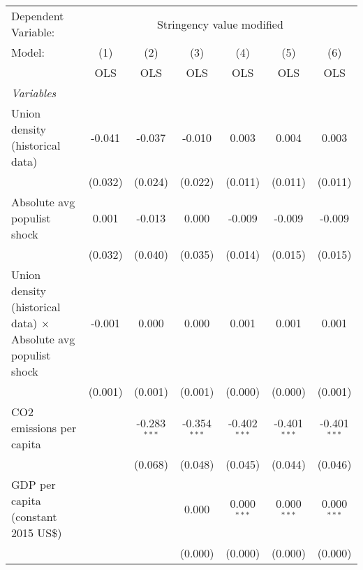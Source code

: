 
\begingroup
\centering
\begin{tabular}{lcccccc}
   \toprule
   Dependent Variable: & \multicolumn{6}{c}{Stringency value modified}\\
   Model:                                                                & (1)     & (2)            & (3)            & (4)            & (5)            & (6)\\  
                                                                         &  OLS    & OLS            & OLS            & OLS            & OLS            & OLS\\  
   \midrule
   \emph{Variables}\\
   Union density (historical data)                                       & -0.041  & -0.037         & -0.010         & 0.003          & 0.004          & 0.003\\   
                                                                         & (0.032) & (0.024)        & (0.022)        & (0.011)        & (0.011)        & (0.011)\\   
   Absolute avg populist shock                                           & 0.001   & -0.013         & 0.000          & -0.009         & -0.009         & -0.009\\   
                                                                         & (0.032) & (0.040)        & (0.035)        & (0.014)        & (0.015)        & (0.015)\\   
   Union density (historical data) $\times$ Absolute avg populist shock  & -0.001  & 0.000          & 0.000          & 0.001          & 0.001          & 0.001\\   
                                                                         & (0.001) & (0.001)        & (0.001)        & (0.000)        & (0.000)        & (0.001)\\   
   CO2 emissions per capita                                              &         & -0.283$^{***}$ & -0.354$^{***}$ & -0.402$^{***}$ & -0.401$^{***}$ & -0.401$^{***}$\\   
                                                                         &         & (0.068)        & (0.048)        & (0.045)        & (0.044)        & (0.046)\\   
   GDP per capita (constant 2015 US\$)                                   &         &                & 0.000          & 0.000$^{***}$  & 0.000$^{***}$  & 0.000$^{***}$\\   
                                                                         &         &                & (0.000)        & (0.000)        & (0.000)        & (0.000)\\   

\end{tabular}
